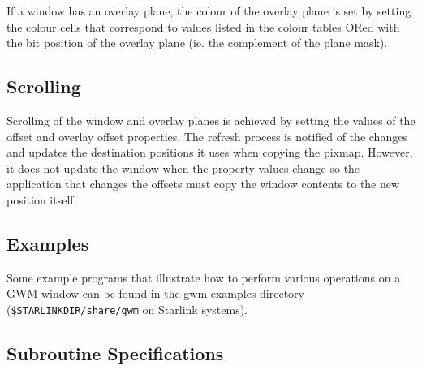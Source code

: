 \documentclass[twoside,11pt]{article}
\renewcommand{\_}{\texttt{\symbol{95}}}
\begin{document}
If a window has an overlay plane, the colour of the overlay plane is set
by setting the colour cells that correspond to values listed in the
colour tables ORed with the bit position of the overlay plane (ie. the
complement of the plane mask).

\subsection{Scrolling}
Scrolling of the window and overlay planes is achieved by setting the
values of the offset and overlay offset properties. The refresh process
is notified of the changes and updates the destination positions it uses
when copying the pixmap. However, it does not update the window when the
property values change so the application that changes the offsets must
copy the window contents to the new position itself.

\subsection{Examples}

Some example programs that illustrate how to perform various operations on a
GWM window can be found in the gwm examples directory
({\tt \$STARLINK\_DIR/share/gwm}
on Starlink systems).

\newpage
\subsection{Subroutine Specifications}
\end{document}
